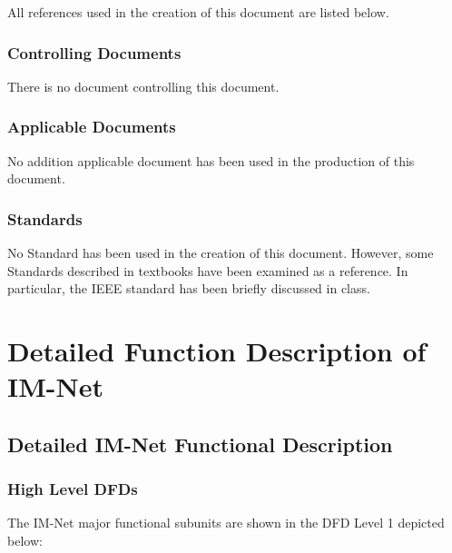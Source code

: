 \documentclass[letterpaper]{article}
\begin{document}
All references used in the creation of this document are listed below.

\subsubsection{\textcolor{subsubsection}{Controlling Documents}}

There is no document controlling this document.

\subsubsection{\textcolor{subsubsection}{Applicable Documents}}

No addition applicable document has been used in the production of this document.

\subsubsection{\textcolor{subsection}{Standards}}

No Standard has been used in the creation of this document. However, some Standards described in textbooks have been examined as a reference. In particular, the IEEE standard has been briefly discussed in class.

\eject

\section{\textcolor{section}{Detailed Function Description of IM-Net}}

\subsection{\textcolor{subsection}{Detailed IM-Net Functional Description}}

\subsubsection{\textcolor{subsubsection}{High Level DFDs}}

The IM-Net major functional subunits are shown in the DFD Level 1 depicted below:
\end{document}
